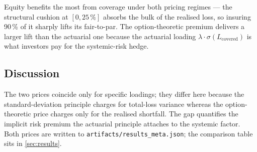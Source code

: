 Equity benefits the most from coverage under both pricing regimes —
the structural cushion at $[0, 25\,\%]$ absorbs the bulk of the
realised loss, so insuring 90\,\% of it sharply lifts its fair-to-par.
The option-theoretic premium delivers a larger lift than the actuarial
one because the actuarial loading $\lambda \cdot \sigma(L_{\mathrm{covered}})$
is what investors pay for the systemic-risk hedge.

\subsection{Discussion}

The two prices coincide only for specific loadings; they differ here
because the standard-deviation principle charges for total-loss
variance whereas the option-theoretic price charges only for the
realised shortfall. The gap quantifies the implicit risk premium the
actuarial principle attaches to the systemic factor. Both prices are
written to \texttt{artifacts/results\_meta.json}; the comparison table
sits in \cref{sec:results}.
